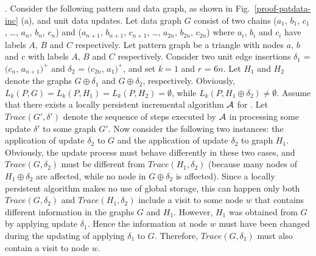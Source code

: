 
.
Consider the following pattern and data graph, as shown in Fig.~\ref{proof-patdata-inc} (a), and unit data updates.
Let data graph $G$ consist of two chains ($a_1$, $b_1$, $c_1$, \ldots, $a_n$, $b_n$, $c_n$) and ($a_{n+1}$, $b_{n+1}$, $c_{n+1}$, \ldots, $a_{2n}$, $b_{2n}$, $c_{2n}$) where $a_i$, $b_i$ and $c_i$ have labels $A$, $B$ and $C$ respectively.
Let pattern graph be a triangle with nodes $a$, $b$ and $c$ with labels $A$, $B$ and $C$ respectively.
Consider two unit edge insertions $\delta_1$ = $(c_n$, $a_{n+1})^+$ and $\delta_2$ = $(c_{2n}$, $a_1)^+$,
and set $k = 1$ and $r$ = $6n$.
Let $H_1$ and $H_2$ denote the graphs $G\oplus \delta_1$ and $G\oplus \delta_2$, respectively.
Obviously, $L_{k}(P, G) = L_{k}(P, H_1) = L_{k}(P, H_2) = \emptyset$,
while $L_{k}(P, H_1\oplus \delta_2) \neq \emptyset$.
Assume that there exists a locally persistent incremental algorithm ${\cal A}$ for \dynteamF.
Let $Trace(G', \delta')$ denote the sequence of steps executed by ${\cal A}$ in processing some update $\delta'$ to some graph $G'$.
Now consider the following two instances: the application of update $\delta_2$ to $G$ and the application of update $\delta_2$ to graph $H_1$.
Obviously, the update process must behave differently in these two cases, and $Trace(G, \delta_2)$ must be different from $Trace(H_1, \delta_2)$
(because many nodes of $H_1\oplus \delta_2$ are affected, while no node in $G\oplus \delta_2$ is affected).
Since a locally persistent algorithm makes no use of global storage, this can happen only both $Trace(G, \delta_2)$ and $Trace(H_1, \delta_2)$ include a visit to some node $w$ that contains different information in the graphs $G$ and $H_1$.
However, $H_1$ was obtained from $G$ by applying update $\delta_1$.
Hence the information at node $w$ must have been changed during the updating of applying $\delta_1$ to $G$.
Therefore, $Trace(G, \delta_1)$ must also contain a visit to node $w$.
